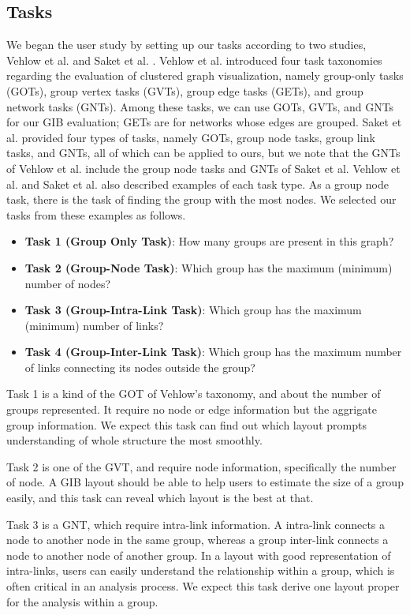 \documentclass{vgtc}                          %
\begin{document}
\subsection{Tasks}
\label{task}
We began the user study by setting up our tasks according to two studies, Vehlow et al. \cite{Vehlow2017VisualizingGS} and Saket et al. \cite{saket2014group}.
Vehlow et al. introduced four task taxonomies regarding the evaluation of clustered graph visualization, namely group-only tasks (GOTs), group vertex tasks (GVTs), group edge tasks (GETs), and group network tasks (GNTs).
Among these tasks, we can use GOTs, GVTs, and GNTs for our GIB evaluation; GETs are for networks whose edges are grouped.
Saket et al. provided four types of tasks, namely GOTs, group node tasks, group link tasks, and GNTs, all of which can be applied to ours, but we note that the GNTs of Vehlow et al. include the group node tasks and GNTs of Saket et al.
Vehlow et al. and Saket et al. also described examples of each task type.
As a group node task, there is the task of finding the group with the most nodes. We selected our tasks from these examples as follows.

\begin{itemize}
\item {\bf Task 1 (Group Only Task)}: How many groups are present in this graph?
\item {\bf Task 2 (Group-Node Task)}: Which group has the maximum (minimum) number of nodes?
\item {\bf Task 3 (Group-Intra-Link Task)}: Which group has the maximum (minimum) number of links?
\item {\bf Task 4 (Group-Inter-Link Task)}: Which group has the maximum number of links connecting its nodes outside the group?
\end{itemize}

Task 1 is a kind of the GOT of Vehlow's taxonomy, and about the number of groups represented. It require no node or edge information but the aggrigate group information. We expect this task can find out which layout prompts understanding of whole structure the most smoothly.

Task 2 is one of the GVT, and require node information, specifically the number of node. A GIB layout should be able to help users to estimate the size of a group easily, and this task can reveal which layout is the best at that.

Task 3 is a GNT, which require intra-link information. A intra-link connects a node to another node in the same group, whereas a group inter-link connects a node to another node of another group.
In a layout with good representation of intra-links, users can easily understand the relationship within a group, which is often critical in an analysis process. We expect this task derive one layout proper for the analysis within a group.
\end{document}
